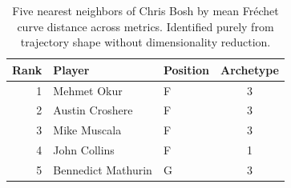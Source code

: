 \begin{table}[htbp]
  \centering\small
  \begin{tabular}{rllc}
    \toprule
    Rank & Player & Position & Archetype \\
    \midrule
    1 & Mehmet Okur & F & 3 \\
    2 & Austin Croshere & F & 3 \\
    3 & Mike Muscala & F & 3 \\
    4 & John Collins & F & 1 \\
    5 & Bennedict Mathurin & G & 3 \\
    \bottomrule
  \end{tabular}
  \caption{Five nearest neighbors of Chris Bosh by mean Fr\'{e}chet curve distance across metrics. Identified purely from trajectory shape without dimensionality reduction.}
  \label{tab:Chris_Bosh_frechet_curve_neighbors}
\end{table}

